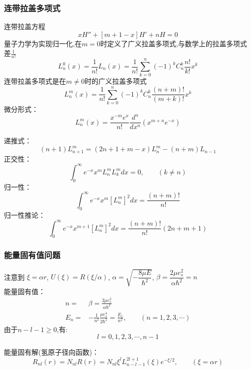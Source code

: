 \begin{frame}
	\frametitle{连带拉盖多项式}
	连带拉盖方程
	\begin{equation*}
		\boxed{x H''  + [m+1 -x] H' +n H =0}
	\end{equation*}	
	量子力学为实现归一化,在$m=0$时定义了广义拉盖多项式,与数学上的拉盖多项式差$\frac{1}{n!}$
	\begin{equation*}
		L^0 _n (x)= \frac{1} {n!} L_n (x) = \frac{1} {n!} \sum_{k=0}^{n} (-1)^k C^k _n \frac{n!}{k!}x^k
	\end{equation*}	
	连带拉盖多项式是在$m\ne0$时的广义拉盖多项式
	\begin{equation*}
		L^m _n (x)= \frac{1} {n!}  \sum_{k=0}^{n} (-1)^k C^k _n \frac{(n+m)!}{(m+k)!}x^k
	\end{equation*}	
	微分形式： 
	\begin{equation*}
		L^m _n(x) =\frac{x^{-m}e^x  }{n!} \frac{d ^n}{d x^n} (x^{m+n} e^{-x})
	\end{equation*}	
\end{frame}		

\begin{frame}
	递推式：
	\begin{equation*}
		(n+1)	L^m _{n+1} = (2n+1+m -x) L^m _n  - (n+m)  L_{n-1}  
	\end{equation*}	
	正交性：
	\begin{equation*}
		\int_{0}^{\infty}  e^{-x} x^m  L^m _n L^ m _k dx =0, \qquad  (k\ne n)
	\end{equation*}	
	归一性：
	\begin{equation*}
		\int_{0}^{\infty}  e^{-x} x^m  [L^m _{n}]^2  dx = \frac{(n+m)!}{n!} 
	\end{equation*}			
	归一性推论：
	\begin{equation*}
		\int_{0}^{\infty}  e^{-x} x^{m+1}  [L^m _{n}]^2  dx = \frac{(n+m)!}{n!}  (2n+m+1)
	\end{equation*}			
\end{frame}		

\begin{frame}
	\frametitle{能量固有值问题}	
	注意到 $\xi=\alpha r$, $U(\xi)=R(\xi /\alpha) $, $\alpha =\sqrt{-\dfrac{8\mu E}{\hbar^2}}$, $\beta=\dfrac{2\mu e^2 _s}{\alpha \hbar^2}=n$\\
	能量固有值：
	\\\begin{equation*}
		\begin{split}
			n =&\beta = \frac{2\mu e^2 _s}{\alpha \hbar ^2} \\
			E_n =& - \frac{1}{n^2} \frac{\mu e^4 _s }{2 \hbar ^2} =\frac{E_1}{n^2}, \qquad (n=1,2,3,\cdots) 
		\end{split}		
	\end{equation*}	
	由于${n-l-1\ge 0}$,有:
	\[ l=0,1,2,3,\cdots, n-1\]	

	能量固有解(氢原子径向函数)：
	\begin{equation*}
		R_{nl} (r) =N_{nl}R(r)=N_{nl} \xi  ^l  L_{n-l-1} ^{2l+1} (\xi) e^{-\xi/2} , \qquad (\xi =\alpha r)
	\end{equation*}	
\end{frame}			

